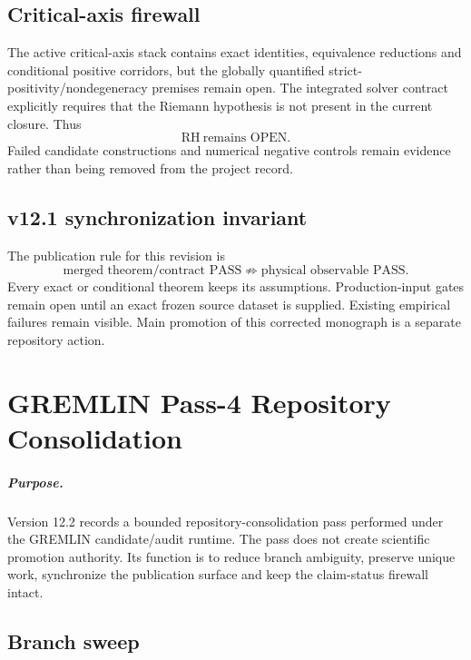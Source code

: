 \documentclass[11pt,a4paper,twoside]{book}
\theoremstyle{definition}
\begin{document}
\section{Critical-axis firewall}

The active critical-axis stack contains exact identities, equivalence
reductions and conditional positive corridors, but the globally quantified
strict-positivity/nondegeneracy premises remain open.  The integrated solver
contract explicitly requires that the Riemann hypothesis is not present in the
current closure.  Thus
\[
\boxed{\mathrm{RH}\ \text{remains OPEN}.}
\]
Failed candidate constructions and numerical negative controls remain evidence
rather than being removed from the project record.

\section{v12.1 synchronization invariant}

The publication rule for this revision is
\[
\boxed{
\text{merged theorem/contract PASS}
\not\Rightarrow
\text{physical observable PASS}.
}
\]
Every exact or conditional theorem keeps its assumptions.  Production-input
gates remain open until an exact frozen source dataset is supplied.  Existing
empirical failures remain visible.  Main promotion of this corrected monograph
is a separate repository action.

\clearpage

\chapter{GREMLIN Pass-4 Repository Consolidation}
\label{app:v12_gremlin_pass4}

\paragraph{Purpose.}
Version 12.2 records a bounded repository-consolidation pass performed under the
GREMLIN candidate/audit runtime.  The pass does not create scientific promotion
authority.  Its function is to reduce branch ambiguity, preserve unique work,
synchronize the publication surface and keep the claim-status firewall intact.

\section{Branch sweep}
\end{document}
